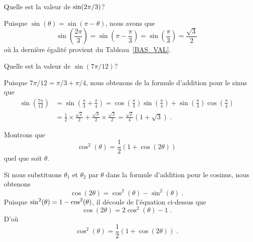 {\begin{rmk}[\theory]

\label{proof_add}
\end{rmk}

\begin{egg}
Quelle est la valeur de $\displaystyle \sin(2\pi/3)$?

Puisque $\sin(\theta) = \sin(\pi - \theta)$, nous avons que
\[
\sin\left(\frac{2\pi}{3}\right) = \sin\left(\pi - \frac{\pi}{3}\right)
= \sin\left(\frac{\pi}{3}\right) = \frac{\sqrt{3}}{2}
\]
où la dernière égalité provient du Tableau~\ref{BAS_VAL}.
\end{egg}

\begin{egg}
Quelle est la valeur de $\sin(7\pi/12)$?

Puisque $7\pi/12 = \pi/3 + \pi/4$, nous obtenons de la formule d'addition
pour le sinus que
\begin{align*}
\sin\left(\frac{7\pi}{12}\right) &=
\sin\left(\frac{\pi}{3} + \frac{\pi}{4}\right)
= \cos\left(\frac{\pi}{3}\right) \sin\left(\frac{\pi}{4}\right) +
\sin\left(\frac{\pi}{3}\right) \cos\left(\frac{\pi}{4}\right) \\
&= \frac{1}{2} \times \frac{\sqrt{2}}{2} + \frac{\sqrt{3}}{2}
\times \frac{\sqrt{2}}{2}
= \frac{\sqrt{2}}{4} \left( 1 + \sqrt{3}\right) \; .
\end{align*}
\end{egg}

\begin{egg}
Montrons que
\begin{equation}\label{db_angle}
\cos^2(\theta) = \frac{1}{2} \left( 1 + \cos(2\theta) \right)
\end{equation}
quel que soit $\theta$.

Si nous substituons $\theta_1$ et $\theta_2$ par $\theta$ dans la
formule d'addition pour le cosinus, nous obtenons
\[
\cos(2 \theta) = \cos^2(\theta) - \sin^2(\theta) \; .
\]
Puisque $\displaystyle \sin^2(\theta) = 1 - \cos^2(\theta)$, il découle de
l'équation ci-dessus que
\begin{equation} \label{doubleAngle}
\cos(2 \theta) = 2 \cos^2(\theta) - 1 \; .
\end{equation}
D'où
\[
\cos^2(\theta) = \frac{1}{2} \left( 1 + \cos(2\theta) \right) \; .
\]
\end{egg}

}
